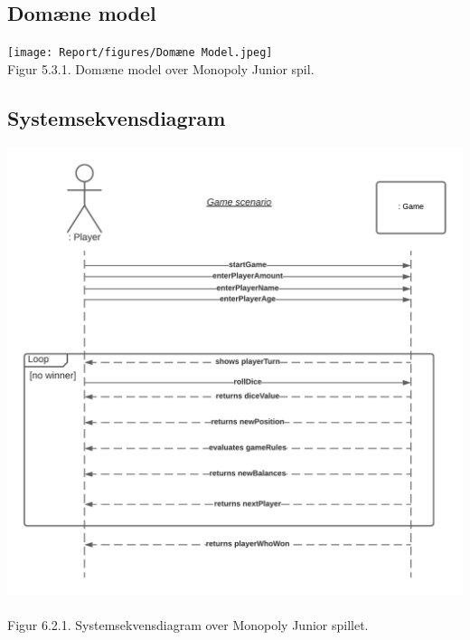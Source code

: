\begin{flushleft}
\subsection{Domæne model}
\texttt{[image: Report/figures/Domæne Model.jpeg]}~\\[1cm]
Figur 5.3.1. Domæne model over Monopoly Junior spil.

\subsection{Systemsekvensdiagram}
\includegraphics[width=1\textwidth]{Report/figures/System sekvensdiagram.png}~\\[1cm]
Figur 6.2.1. Systemsekvensdiagram over Monopoly Junior spillet.

\end{flushleft}